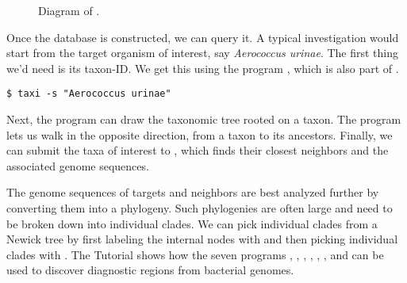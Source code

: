 \begin{figure}
  \begin{center}
    
  \end{center}
  \caption{Diagram of .}\label{fig:db}
\end{figure}

Once the database is constructed, we can query it. A typical
investigation would start from the target organism of interest,
say \emph{Aerococcus urinae}. The first thing we'd need is its
taxon-ID. We get this using the program , which is also part
of .
\begin{verbatim}
$ taxi -s "Aerococcus urinae"
\end{verbatim}
Next, the program  can draw the taxonomic tree rooted on a
taxon. The program  lets us walk in the opposite direction,
from a taxon to its ancestors. Finally, we can submit the taxa of
interest to , which finds their closest neighbors and
the associated genome sequences.

The genome sequences of targets and neighbors are best analyzed
further by converting them into a phylogeny. Such phylogenies are
often large and need to be broken down into individual clades. We can
pick individual clades from a Newick tree by first labeling the
internal nodes with  and then picking individual clades
with . The Tutorial shows how the seven
programs , , , ,
, , and  can be used to discover
diagnostic regions from bacterial genomes.
